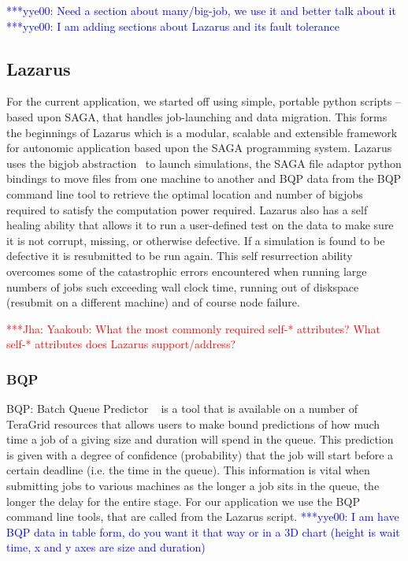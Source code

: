 \documentclass[conference,final]{IEEEtran}
\newcommand{\jhanote}[1]{ {\textcolor{red} { ***Jha: #1 }}}
\newcommand{\yyenote}[1]{ {\textcolor{blue} { ***yye00: #1 }}}
\begin{document}
\yyenote{Need a section about many/big-job, we use it and better talk about it}
\yyenote{I am adding sections about Lazarus and its fault tolerance}

\subsection{Lazarus}
For the current application, we started off using simple, portable
python scripts -- based upon SAGA, that handles job-launching and data
migration. This forms the beginnings of Lazarus which is a modular,
scalable and extensible framework for autonomic application based upon
the SAGA programming system.  Lazarus uses the bigjob
abstraction~\cite{ICCS_paper, saga_royalsoc} to launch simulations,
the SAGA file adaptor python bindings to move files from one machine
to another and BQP data from the BQP command line tool to retrieve the
optimal location and number of bigjobs required to satisfy the
computation power required. Lazarus also has a self healing ability
that allows it to run a user-defined test on the data to make sure it
is not corrupt, missing, or otherwise defective. If a simulation is
found to be defective it is resubmitted to be run again. This self
resurrection ability overcomes some of the catastrophic errors
encountered when running large numbers of jobs such exceeding wall
clock time, running out of diskspace (resubmit on a different machine)
and of course node failure.

\jhanote{Yaakoub: What the most commonly required self-* attributes?
  What self-* attributes does Lazarus support/address?}

\subsubsection{BQP}
BQP: Batch Queue Predictor ~\cite{bqp} is a tool that is available on
a number of TeraGrid resources that allows users to make bound
predictions of how much time a job of a giving size and duration will
spend in the queue.  This prediction is given with a degree of
confidence (probability) that the job will start before a certain
deadline (i.e. the time in the queue).  This information is vital when
submitting jobs to various machines as the longer a job sits in the
queue, the longer the delay for the entire stage.  For our application
we use the BQP command line tools, that are called from the Lazarus
script.  \yyenote{I am have BQP data in table form, do you want it
  that way or in a 3D chart (height is wait time, x and y axes are
  size and duration)}
\end{document}
